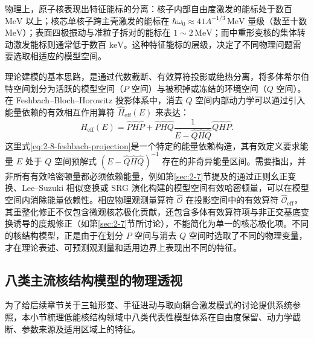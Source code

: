 物理上，原子核表现出特征能标的分离：核子内部自由度激发的能标处于数百 $\mathrm{MeV}$ 以上；核芯单核子跨主壳激发的能标在 $\hbar\omega_0 \approx 41 A^{-1/3}\,\mathrm{MeV}$ 量级（数至十数 $\mathrm{MeV}$）；表面四极振动与准粒子拆对的能标在 $1\sim 2\,\mathrm{MeV}$；而中重形变核的集体转动激发能标则通常低于数百 $\mathrm{keV}$。这种特征能标的层级，决定了不同物理问题需要选取相适应的模型空间。

理论建模的基本思路，是通过代数截断、有效算符投影或绝热分离，将多体希尔伯特空间划分为活跃的模型空间（$P$ 空间）与被积掉或冻结的环境空间（$Q$ 空间）。在 Feshbach--Bloch--Horowitz 投影体系中，消去 $Q$ 空间内部动力学可以通过引入能量依赖的有效相互作用算符 $\hat{H}_{\mathrm{eff}}(E)$ 来表达：
\begin{equation}\label{eq:2-8-feshbach-projection}
\hat{H}_{\mathrm{eff}}(E) = \hat{P}\hat{H}\hat{P} + \hat{P}\hat{H}\hat{Q}\frac{1}{E - \hat{Q}\hat{H}\hat{Q}}\hat{Q}\hat{H}\hat{P} .
\end{equation}
这里式\eqref{eq:2-8-feshbach-projection}是一个特定的能量依赖构造，其有效定义要求能量 $E$ 处于 $Q$ 空间预解式 $(E - \hat{Q}\hat{H}\hat{Q})^{-1}$ 存在的非奇异能量区间。需要指出，并非所有有效哈密顿量都必须依赖能量，例如第\ref{sec:2-7}节提及的通过正则幺正变换、Lee--Suzuki 相似变换或 SRG 演化构建的模型空间有效哈密顿量，可以在模型空间内消除能量依赖性。相应物理观测量算符 $\hat{\mathcal{O}}$ 在投影空间中的有效算符 $\hat{\mathcal{O}}_{\mathrm{eff}}$，其重整化修正不仅包含微观核芯极化贡献，还包含多体有效算符项与非正交基底变换诱导的度规修正（如第\ref{sec:2-7}节所讨论），不能简化为单一的核芯极化项。不同的核结构模型，正是由于在划分 $P$ 空间与消去 $Q$ 空间时选取了不同的物理变量，才在理论表述、可预测观测量和适用边界上表现出不同的特征。

\subsection{八类主流核结构模型的物理透视}\label{sec:2-8-2}

为了给后续章节关于三轴形变、手征进动与取向耦合激发模式的讨论提供系统参照，本小节梳理低能核结构领域中八类代表性模型体系在自由度保留、动力学截断、参数来源及适用区域上的特征。\cite{book-bohr-mottelson-nuclear-structure-vol2,book-suhonen-from-nucleons-to-nucleus,prochniak-rohozinski-2009-bohr-collective-hamiltonian,frauendorf-2001-spontaneous-symmetry-breaking-rotating-nuclei,doctoral-r1-g28-otsuka-2023-type-ii-shell-evolution}

